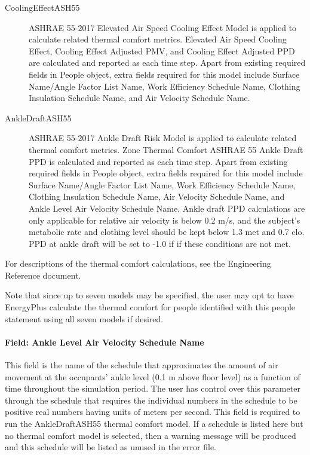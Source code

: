 \begin{description}
  \item[CoolingEffectASH55]
  ASHRAE 55-2017 Elevated Air Speed Cooling Effect Model is applied to calculate related thermal comfort metrics. Elevated Air Speed Cooling Effect, Cooling Effect Adjusted PMV, and Cooling Effect Adjusted PPD are calculated and reported as each time step. Apart from existing required fields in People object, extra fields required for this model include Surface Name/Angle Factor List Name, Work Efficiency Schedule Name, Clothing Insulation Schedule Name, and Air Velocity Schedule Name.

  \item[AnkleDraftASH55]
  ASHRAE 55-2017 Ankle Draft Risk Model is applied to calculate related thermal comfort metrics. Zone Thermal Comfort ASHRAE 55 Ankle Draft PPD is calculated and reported as each time step. Apart from existing required fields in People object, extra fields required for this model include Surface Name/Angle Factor List Name, Work Efficiency Schedule Name, Clothing Insulation Schedule Name, Air Velocity Schedule Name, and Ankle Level Air Velocity Schedule Name. Ankle draft PPD calculations are only applicable for relative air velocity is below 0.2 m/s, and the subject’s metabolic rate and clothing level should be kept below 1.3 met and 0.7 clo. PPD at ankle draft will be set to -1.0 if if these conditions are not met.

\end{description}

 For descriptions of the thermal comfort calculations, see the Engineering Reference document.

 Note that since up to seven models may be specified, the user may opt to have EnergyPlus calculate the thermal comfort for people identified with this people statement using all seven models if desired.


\paragraph{Field: Ankle Level Air Velocity Schedule Name}\label{field-ankle-level-air-velocity-schedule-name}

This field is the name of the schedule that approximates the amount of air movement at the occupants' ankle level (0.1 m above floor level) as a function of time throughout the simulation period. The user has control over this parameter through the schedule that requires the individual numbers in the schedule to be positive real numbers having units of meters per second. This field is required to run the AnkleDraftASH55 thermal comfort model. If a schedule is listed here but no thermal comfort model is selected, then a warning message will be produced and this schedule will be listed as unused in the error file.

